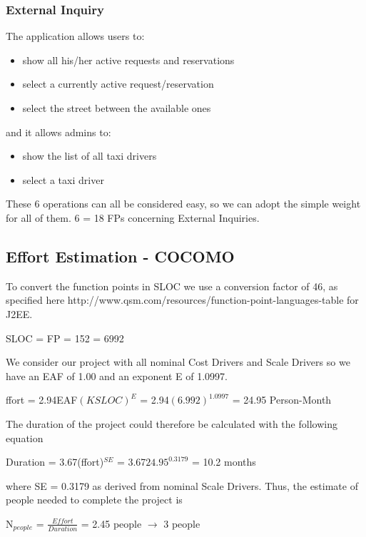 \documentclass{article}
\begin{document}
\subsubsection{External Inquiry}
The application allows users to:
\begin{itemize}
	\item show all his/her active requests and reservations
	\item select a currently active request/reservation
	\item select the street between the available ones
\end{itemize}
and it allows admins to:
\begin{itemize}
	\item show the list of all taxi drivers
	\item select a taxi driver
\end{itemize}
These 6 operations can all be considered easy, so we can adopt the simple weight for all of them. 6 = 18 FPs concerning External Inquiries.

\subsection{Effort Estimation - COCOMO}
To convert the function points in SLOC we use a 
conversion factor of 46, as specified here 
http://www.qsm.com/resources/function-point-languages-table
for J2EE.
\begin{center}
	SLOC = FP  = 152  = 6992
\end{center}
We consider our project with all nominal Cost Drivers and
Scale Drivers so we have an EAF of 1.00 and an
exponent E of 1.0997.
\begin{center}
	\EUR ffort = 2.94\texttimes EAF\texttimes $(KSLOC)^{E}$ = 2.94\texttimes$(6.992)^{1.0997}$ = 24.95 Person-Month
\end{center}
The duration of the project could therefore be calculated with the following equation
\begin{center}
	Duration = 3.67\texttimes(\EUR ffort)$^{SE}$ = 3.67\texttimes$24.95^{0.3179}$ = 10.2 months
\end{center}
where SE = 0.3179 as derived from nominal Scale Drivers.
Thus, the estimate of people needed to complete the project is
\begin{center}
	N$_{people}$ = $\frac{Effort}{Duration}$ = 2.45 people $\rightarrow$ 3 people
\end{center}
\end{document}
